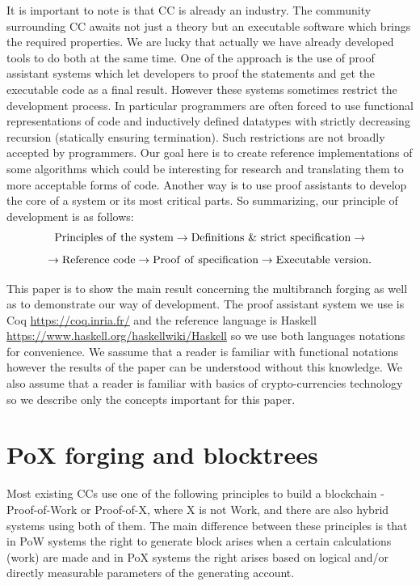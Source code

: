 \documentclass[12pt]{article}
\begin{document}
It is important to note is that CC is already an industry. The community surrounding CC awaits not just a theory but an executable software which brings 
the required properties. We are lucky that actually we have already developed tools to do both at the same time. One
of the approach is the use of proof assistant systems which let developers to proof the statements and get the executable code as a final result. However these 
systems sometimes restrict the development process. In particular programmers are often forced to use functional representations of code and inductively 
defined datatypes with strictly decreasing recursion (statically ensuring termination). Such restrictions are not broadly accepted by programmers. 
Our goal here is to create reference implementations of some algorithms which could be interesting for research and translating them to more acceptable 
forms of code. Another way is to use proof assistants to develop the core of a system or its most critical parts. 
So summarizing, our principle of development is as follows:
$$
{\rm Principles\ of\ the\ system}\to{\rm Definitions\ \&\ strict\ specification}\to
$$
$$
\to{\rm Reference\ code}\to{\rm Proof\ of\ specification}\to{\rm Executable\ version}.
$$  

This paper is to show the main result concerning the multibranch forging as well as to demonstrate our way of development. The proof assistant system we use is 
Coq \url{https://coq.inria.fr/} and the reference language is Haskell \url{https://www.haskell.org/haskellwiki/Haskell} so we use both languages notations 
for convenience. We sassume that a reader is familiar with functional notations however the results of the paper can be understood without this knowledge. 
We also assume that a reader is familiar with basics of crypto-currencies technology so we describe only the concepts important for this paper.

\section{PoX forging and blocktrees}
Most existing CCs use one of the following principles to build a blockchain \-- Proof-of-Work or Proof-of-X, where X is not Work, 
and there are also hybrid 
systems using both of them. The main difference between these principles is that in PoW systems the right to generate block arises 
when a certain calculations (work) are made and in PoX systems the right arises based on logical and/or directly measurable parameters of the generating account. 
\end{document}
